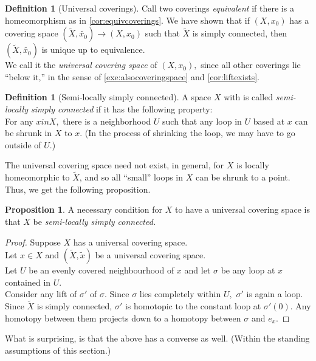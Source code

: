 \documentclass[12pt]{article}
\theoremstyle{definition}
\numberwithin{thm}{section}
\newtheorem{defn}[thm]{Definition}
\newtheorem{prop}[thm]{Proposition}
\begin{document}
\begin{defn}[Universal coverings]
	Call two coverings \emph{equivalent} if there is a homeomorphism as in \cref{cor:equivcoverings}. We have shown that if $(X, x_0)$ has a covering space $(\tilde{X}, \widetilde{x_0}) \to (X, x_0)$ such that $\tilde{X}$ is simply connected, then $(\tilde{X}, \widetilde{x_0})$ is unique up to equivalence.\\
	We call it the \emph{universal covering space} of $(X, x_0),$ since all other coverings lie ``below it,'' in the sense of \ref{exe:alsocoveringspace} and \ref{cor:liftexists}.
\end{defn}

\begin{defn}[Semi-locally simply connected]
	A space $X$ with is called \emph{semi-locally simply connected} if it has the following property:\\
	For any $x in X,$ there is a neighborhood $U$ such that any loop in $U$ based at $x$ can be shrunk in $X$ to $x.$ (In the process of shrinking the loop, we may have to go outside of $U.$)
\end{defn}

The universal covering space need not exist, in general, for $X$ is locally homeomorphic to $\tilde{X}$, and so all ``small'' loops in $X$ can be shrunk to a point. Thus, we get the following proposition. 
\begin{prop}
	A necessary condition for $X$ to have a universal covering space is that $X$ be \emph{semi-locally simply connected.}
\end{prop}
\begin{proof} 
	Suppose $X$ has a universal covering space.\\
	Let $x \in X$ and $(\tilde{X}, \tilde{x})$ be a universal covering space.\\
	Let $U$ be an evenly covered neighbourhood of $x$ and let $\sigma$ be any loop at $x$ contained in $U.$\\
	Consider any lift of $\sigma'$ of $\sigma.$ Since $\sigma$ lies completely within $U,$ $\sigma'$ is again a loop. Since $\tilde{X}$ is simply connected, $\sigma'$ is homotopic to the constant loop at $\sigma'(0).$ Any homotopy between them projects down to a homotopy between $\sigma$ and $e_x.$
\end{proof}

What is surprising, is that the above has a converse as well. (Within the standing assumptions of this section.)
\end{document}
